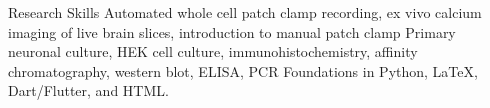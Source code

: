 \begin{rubric}{Research Skills}
%
	Automated whole cell patch clamp recording, ex vivo calcium imaging of live brain slices, introduction to manual patch clamp
%
%
	Primary neuronal culture, HEK cell culture, immunohistochemistry, affinity chromatography, western blot, ELISA, PCR
%
%
	Foundations in Python, LaTeX, Dart/Flutter, and HTML.
%
\end{rubric}